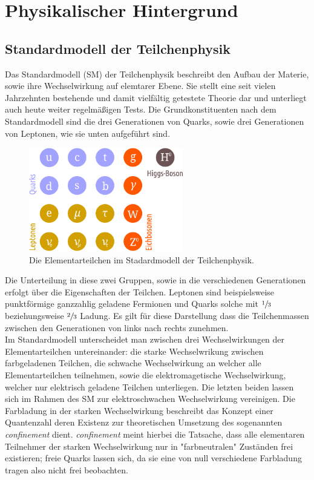 \chapter{Physikalischer Hintergrund}
%
\section{Standardmodell der Teilchenphysik}
%
Das Standardmodell (SM) der Teilchenphysik beschreibt den Aufbau der Materie, sowie ihre Wechselwirkung auf elemtarer Ebene. Sie stellt eine seit vielen Jahrzehnten bestehende und damit vielfältig getestete Theorie dar und unterliegt auch heute weiter regelmäßigen Tests.
Die Grundkonstituenten nach dem Standardmodell sind die drei Generationen von Quarks, sowie drei Generationen von Leptonen, wie sie unten aufgeführt sind.

\begin{figure}
  \centering
      \includegraphics[width=0.6\textwidth]{content/SM.pdf}
  \caption{Die Elementarteilchen im Stadardmodell der Teilchenphysik.}
\end{figure}


Die Unterteilung in diese zwei Gruppen, sowie in die verschiedenen Generationen erfolgt über die Eigenschaften der Teilchen. Leptonen sind beispielsweise punktförmige ganzzahlig geladene Fermionen und Quarks solche mit $\sfrac{1}{3}$ beziehungsweise $\sfrac{2}{3}$ Ladung. Es gilt für diese Darstellung dass die Teilchenmassen zwischen den Generationen von links nach rechts zunehmen.\\
Im Standardmodell unterscheidet man zwischen drei Wechselwirkungen der Elementarteilchen untereinander: die starke Wechselwrikung zwischen farbgeladenen Teilchen, die schwache Wechselwirkung an welcher alle Elementarteilchen teilnehmen, sowie die elektromagetische Wechselwirkung, welcher nur elektrisch geladene Teilchen unterliegen. Die letzten beiden lassen sich im Rahmen des SM zur elektroschwachen Wechselwirkung vereinigen.
Die Farbladung in der starken Wechselwirkung beschreibt das Konzept einer Quantenzahl deren Existenz zur theoretischen Umsetzung des sogenannten \textit{confinement} dient. \textit{confinement} meint hierbei die Tatsache, dass alle elementaren Teilnehmer der starken Wechselwirkung nur in "farbneutralen" Zuständen frei existieren; freie Quarks lassen sich, da sie eine von null verschiedene Farbladung tragen also nicht frei beobachten.

